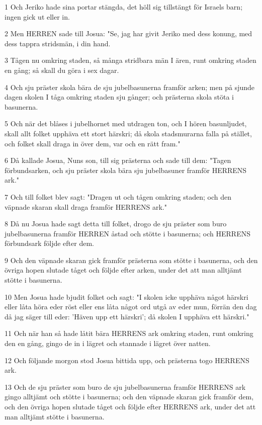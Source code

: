 \par 1 Och Jeriko hade sina portar stängda, det höll sig tillstängt för Israels barn; ingen gick ut eller in.
\par 2 Men HERREN sade till Josua: "Se, jag har givit Jeriko med dess konung, med dess tappra stridsmän, i din hand.
\par 3 Tågen nu omkring staden, så många stridbara män I ären, runt omkring staden en gång; så skall du göra i sex dagar.
\par 4 Och sju präster skola bära de sju jubelbasunerna framför arken; men på sjunde dagen skolen I tåga omkring staden sju gånger; och prästerna skola stöta i basunerna.
\par 5 Och när det blåses i jubelhornet med utdragen ton, och I hören basunljudet, skall allt folket upphäva ett stort härskri; då skola stadsmurarna falla på stället, och folket skall draga in över dem, var och en rätt fram."
\par 6 Då kallade Josua, Nuns son, till sig prästerna och sade till dem: "Tagen förbundsarken, och sju präster skola bära sju jubelbasuner framför HERRENS ark."
\par 7 Och till folket blev sagt: "Dragen ut och tågen omkring staden; och den väpnade skaran skall draga framför HERRENS ark."
\par 8 Då nu Josua hade sagt detta till folket, drogo de sju präster som buro jubelbasunerna framför HERREN åstad och stötte i basunerna; och HERRENS förbundsark följde efter dem.
\par 9 Och den väpnade skaran gick framför prästerna som stötte i basunerna, och den övriga hopen slutade tåget och följde efter arken, under det att man alltjämt stötte i basunerna.
\par 10 Men Josua hade bjudit folket och sagt: "I skolen icke upphäva något härskri eller låta höra eder röst eller ens låta något ord utgå av eder mun, förrän den dag då jag säger till eder: 'Häven upp ett härskri'; då skolen I upphäva ett härskri."
\par 11 Och när han så hade låtit bära HERRENS ark omkring staden, runt omkring den en gång, gingo de in i lägret och stannade i lägret över natten.
\par 12 Och följande morgon stod Josua bittida upp, och prästerna togo HERRENS ark.
\par 13 Och de sju präster som buro de sju jubelbasunerna framför HERRENS ark gingo alltjämt och stötte i basunerna; och den väpnade skaran gick framför dem, och den övriga hopen slutade tåget och följde efter HERRENS ark, under det att man alltjämt stötte i basunerna.

